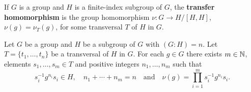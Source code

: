 If $G$ is a group and $H$ is a finite-index subgroup of $G$, the 
\textbf{transfer homomorphism} is the group homomorphism $\nu\colon G\to H/[H,H]$,
$\nu(g)=\nu_T(g)$, for some transversal $T$ of $H$ in $G$.
	
%
%
%


\begin{lemma}
	\label{lem:evaluation}
	Let $G$ be a group and $H$ be a subgroup of $G$ with $(G:H)=n$. Let 
	$T=\{t_1,\dots,t_n\}$ be a transversal of $H$ in $G$.  
	For each $g\in G$ there exists 
	$m\in\mathbb{N}$,  
	elements $s_{1},\dots,s_{m}\in T$ 
	and positive integers $n_1,\dots,n_m$
	such that 
	\[
	s_i^{-1}g^{n_i}s_i\in H,
	\quad
	n_1+\cdots+n_m=n\quad\text{and}\quad   
	\nu(g)=\prod_{i=1}^m s_i^{-1}g^{n_i}s_i.
	\]
\end{lemma}


